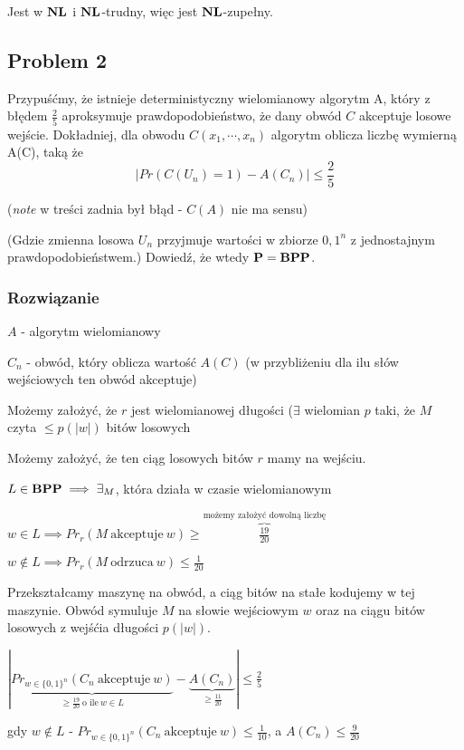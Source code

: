 Jest w $\textbf{NL}$ i $\textbf{NL}$-trudny, więc jest $\textbf{NL}$-zupełny.

\subsection{Problem 2}
Przypuśćmy, że istnieje deterministyczny wielomianowy algorytm A, który z błędem $\frac{2}{5}$ aproksymuje prawdopodobieństwo, że dany obwód $C$ akceptuje losowe wejście. Dokładniej, dla obwodu $C(x_1, \cdots , x_n)$ algorytm oblicza liczbę wymierną A(C), taką że
\[
    |Pr(C(U_n) = 1) - A(C_n)| \leq \frac{2}{5}
\]

(\textit{note} w treści zadnia był błąd - $C(A)$ nie ma sensu)

(Gdzie zmienna losowa $U_n$ przyjmuje wartości w zbiorze ${0, 1}^n$ z jednostajnym prawdopodobieństwem.) Dowiedź, że wtedy $\textbf{P} = \textbf{BPP}$.

\subsubsection*{Rozwiązanie}

$A$ - algorytm wielomianowy

$C_n$ - obwód, który oblicza wartość $A(C)$ (w przybliżeniu dla ilu słów wejściowych ten obwód akceptuje)

Możemy założyć, że $r$ jest wielomianowej długości ($\exists$ wielomian $p$ taki, że $M$ czyta $\leq p(|w|)$ bitów losowych

Możemy założyć, że ten ciąg losowych bitów $r$ mamy na wejściu.

$L \in \textbf{BPP} \implies \exists_M$, która działa w czasie wielomianowym

$w \in L \implies Pr_r(M\ \text{akceptuje}\ w) \geq \overbrace{\frac{19}{20}}^{\text{możemy założyć dowolną liczbę}}$ 

$w \not\in L \implies Pr_r(M\ \text{odrzuca}\ w) \leq \frac{1}{20}$


Przekształcamy maszynę na obwód, a ciąg bitów na stałe kodujemy w tej maszynie. Obwód symuluje $M$ na słowie wejściowym $w$ oraz na ciągu bitów losowych z wejśćia długości $p(|w|)$.

$\left|\underbrace{Pr_{w \in \{0, 1\}^n} (C_n\ \text{akceptuje}\ w)}_{\geq \frac{19}{20}\ \text{o ile}\ w\in L} - \underbrace{A(C_n)}_{\geq \frac{11}{20}}\right| \leq \frac{2}{5}$

gdy $w \not\in L$ - $Pr_{w \in \{0, 1\}^n} (C_n\ \text{akceptuje}\ w) \leq \frac{1}{10}$, a $A(C_n) \leq \frac{9}{20}$

